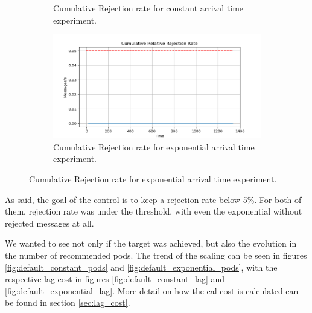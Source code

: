 \begin{figure}[H]
\begin{subfigure}{0.49\linewidth}
	    \caption{Cumulative Rejection rate for constant arrival time experiment.}
	    \label{fig:default_constant_rejection}
	\end{subfigure}
	\begin{subfigure}{0.49\linewidth}
	    \centering
	    \includegraphics[width=1\linewidth]{images/default/exponential/rejection_cumulative.png}
	    \caption{Cumulative Rejection rate for exponential arrival time experiment.}
	    \label{fig:default_exponential_rejection}
	\end{subfigure}
\end{figure}

As said, the goal of the control is to keep a rejection rate below 5\%. For both of them, rejection rate was under the threshold, with even the exponential without rejected messages at all.

We wanted to see not only if the target was achieved, but also the evolution in the number of recommended pods. The trend of the scaling can be seen in figures \ref{fig:default_constant_pods} and \ref{fig:default_exponential_pods}, with the respective lag cost in figures \ref{fig:default_constant_lag} and \ref{fig:default_exponential_lag}. More detail on how the cal cost is calculated can be found in section \ref{sec:lag_cost}.

